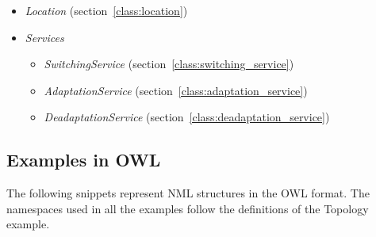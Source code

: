\begin{itemize}
    \item \emph{Location} (section~\ref{class:location})
      
    \item \emph{Services}
      \begin{itemize}
        \item \emph{SwitchingService} (section~\ref{class:switching_service})
          
        \item \emph{AdaptationService} (section~\ref{class:adaptation_service})
          
        \item \emph{DeadaptationService} (section~\ref{class:deadaptation_service})
          
      \end{itemize}

\end{itemize}

\pagebreak

\subsection{Examples in OWL}
The following snippets represent NML structures in the OWL format.
The namespaces used in all the examples follow the definitions of the Topology example.

